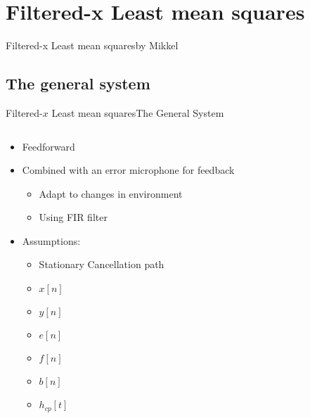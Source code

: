 \section{Filtered-x Least mean squares}

\begin{frame}{Filtered-x Least mean squares}{by Mikkel}
	\small
\end{frame}
\subsection{The general system}
\begin{frame}{Filtered-$x$ Least mean squares}{The General System}
	\begin{columns}
		\begin{column}{0.5\textwidth}		

		\begin{itemize}
		\item Feedforward
		\item Combined with an error microphone for feedback
		\begin{itemize}
		\item Adapt to changes in environment
		\item Using FIR filter		
		\end{itemize}
		\item Assumptions:
		\begin{itemize}
		\item Stationary Cancellation path
		\end{itemize}

		\begin{itemize}
			\setlength{\itemindent}{4em}
			\item[Input] $x[n]$
			\item[Output]$y[n]$
			\item[Error] $e[n]$	
			\item[Filtered x] $f[n]$
			\item[Filter coefficients] $b[n]$	
			\item[Cancellation Path] $h_{cp}[t]$		
		\end{itemize}

		\end{itemize}

		
		\end{column}
		\begin{column}{0.5\textwidth}
		\resizebox{1.1\columnwidth}{!}{	
		
		}
		\end{column}
	\end{columns}
\end{frame}


